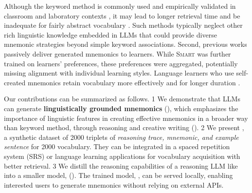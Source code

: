 Although the keyword method is commonly used and empirically validated in classroom and laboratory contexts \citetext{\citealp{atkinsonApplicationMnemonicKeyword1975}, \citealp{pressleyMnemonicKeywordMethod1982}}, it may lead to longer retrieval time \citep{vanhellKeywordMnemonicsRote1997} and be inadequate for fairly abstract vocabulary \citetext{\citealp{CamposLIMITATIONS2003}, \citealp{CamposUSING2011}}. Such methods typically neglect other rich linguistic knowledge embedded in LLMs that could provide diverse mnemonic strategies beyond simple keyword associations. Second, previous works passively deliver generated mnemonics to learners. While \textsc{Smart} \citep{BalepurSMART2024} was further trained on learners' preferences, these preferences were aggregated, potentially missing alignment with individual learning styles. Language learners who use self-created mnemonics retain vocabulary more effectively and for longer duration \citep{madanExploringWordMemorability2021}.


Our contributions can be summarized as follows. \numlist{1} We demonstrate that LLMs can generate \textbf{linguistically grounded mnemonics} (), which emphasizes the importance of linguistic features in creating effective mnemonics in a broader way than keyword method, through reasoning and creative writing (). \numlist{2} We present \links, a synthetic dataset of 2000 triplets of \textit{reasoning trace, mnemonic, and example sentence} for 2000 vocabulary. They can be integrated in a spaced repetition system (SRS) or language learning applications for vocabulary acquisition with better retrieval. \numlist{3} We distill the reasoning capabilities of a reasoning LLM like \teachermodel into a smaller model, \studentmodel (). The trained model, \linksys, can be served locally, enabling interested users to generate mnemonics without relying on external APIs.
